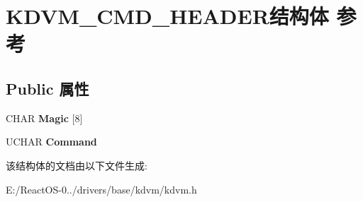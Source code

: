 \hypertarget{struct_k_d_v_m___c_m_d___h_e_a_d_e_r}{}\section{K\+D\+V\+M\+\_\+\+C\+M\+D\+\_\+\+H\+E\+A\+D\+E\+R结构体 参考}
\label{struct_k_d_v_m___c_m_d___h_e_a_d_e_r}
\subsection*{Public 属性}
\begin{DoxyCompactItemize}
\item 
\mbox{\label{struct_k_d_v_m___c_m_d___h_e_a_d_e_r_a4780debf529a4094b1a141ee9e652269}} 
C\+H\+AR {\bfseries Magic} \mbox{[}8\mbox{]}
\item 
\mbox{\label{struct_k_d_v_m___c_m_d___h_e_a_d_e_r_a027872dfaf8626d376d3dc7c39699803}} 
U\+C\+H\+AR {\bfseries Command}
\end{DoxyCompactItemize}


该结构体的文档由以下文件生成\+:\begin{DoxyCompactItemize}
\item 
E\+:/\+React\+O\+S-\/0../drivers/base/kdvm/kdvm.\+h\end{DoxyCompactItemize}
